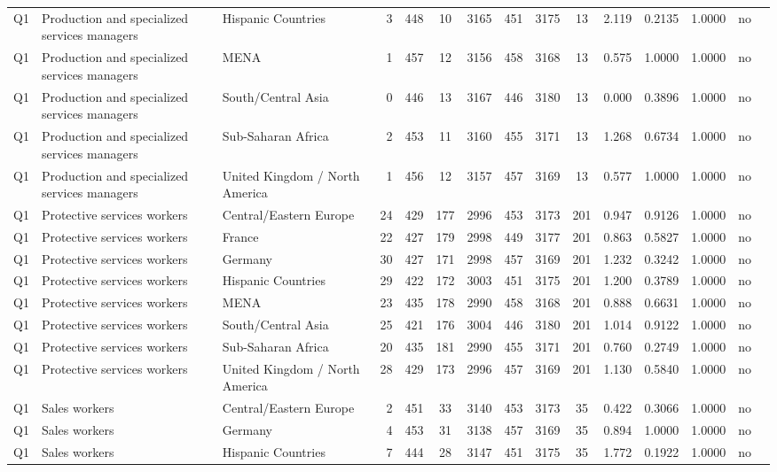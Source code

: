 \begin{longtable}{lllrcccccccccll}
Q1 & Production and specialized services managers & Hispanic Countries & 3 & 448 & 10 & 3165 & 451 & 3175 & 13 & 2.119 & 0.2135 & 1.0000 & no \\
Q1 & Production and specialized services managers & MENA & 1 & 457 & 12 & 3156 & 458 & 3168 & 13 & 0.575 & 1.0000 & 1.0000 & no \\
Q1 & Production and specialized services managers & South/Central Asia & 0 & 446 & 13 & 3167 & 446 & 3180 & 13 & 0.000 & 0.3896 & 1.0000 & no \\
Q1 & Production and specialized services managers & Sub-Saharan Africa & 2 & 453 & 11 & 3160 & 455 & 3171 & 13 & 1.268 & 0.6734 & 1.0000 & no \\
Q1 & Production and specialized services managers & United Kingdom / North America & 1 & 456 & 12 & 3157 & 457 & 3169 & 13 & 0.577 & 1.0000 & 1.0000 & no \\
Q1 & Protective services workers & Central/Eastern Europe & 24 & 429 & 177 & 2996 & 453 & 3173 & 201 & 0.947 & 0.9126 & 1.0000 & no \\
Q1 & Protective services workers & France & 22 & 427 & 179 & 2998 & 449 & 3177 & 201 & 0.863 & 0.5827 & 1.0000 & no \\
Q1 & Protective services workers & Germany & 30 & 427 & 171 & 2998 & 457 & 3169 & 201 & 1.232 & 0.3242 & 1.0000 & no \\
Q1 & Protective services workers & Hispanic Countries & 29 & 422 & 172 & 3003 & 451 & 3175 & 201 & 1.200 & 0.3789 & 1.0000 & no \\
Q1 & Protective services workers & MENA & 23 & 435 & 178 & 2990 & 458 & 3168 & 201 & 0.888 & 0.6631 & 1.0000 & no \\
Q1 & Protective services workers & South/Central Asia & 25 & 421 & 176 & 3004 & 446 & 3180 & 201 & 1.014 & 0.9122 & 1.0000 & no \\
Q1 & Protective services workers & Sub-Saharan Africa & 20 & 435 & 181 & 2990 & 455 & 3171 & 201 & 0.760 & 0.2749 & 1.0000 & no \\
Q1 & Protective services workers & United Kingdom / North America & 28 & 429 & 173 & 2996 & 457 & 3169 & 201 & 1.130 & 0.5840 & 1.0000 & no \\
Q1 & Sales workers & Central/Eastern Europe & 2 & 451 & 33 & 3140 & 453 & 3173 & 35 & 0.422 & 0.3066 & 1.0000 & no \\
Q1 & Sales workers & Germany & 4 & 453 & 31 & 3138 & 457 & 3169 & 35 & 0.894 & 1.0000 & 1.0000 & no \\
Q1 & Sales workers & Hispanic Countries & 7 & 444 & 28 & 3147 & 451 & 3175 & 35 & 1.772 & 0.1922 & 1.0000 & no \\

\end{longtable}
